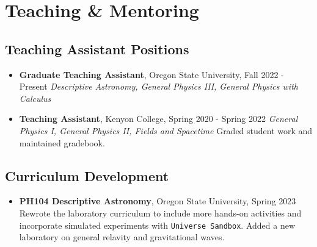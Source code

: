 \documentclass[11pt,letterpaper,sans,unicode]{moderncv}
\newcommand{\blucirc}{{\color{color1} $\circ\;\;$}}
\begin{document}
{%

\section{Teaching \& Mentoring}

\subsection{Teaching Assistant Positions}
\renewcommand\labelitemi{\blucirc}
\begin{itemize}[leftmargin=8mm]
\setlength\itemsep{1mm}
\item \textbf{\color{color1} Graduate Teaching Assistant}, Oregon State University, \hfill Fall 2022 - Present
        \newline  \textit{Descriptive Astronomy, General Physics III, General Physics with Calculus }
\item \textbf{\color{color1} Teaching Assistant}, Kenyon College, \hfill Spring 2020 - Spring 2022
        \newline  \textit{General Physics I, General Physics II, Fields and Spacetime}
        \newline Graded student work and maintained gradebook.
\end{itemize}

\subsection{Curriculum Development}
\renewcommand\labelitemi{\blucirc}
\begin{itemize}[leftmargin=8mm]
\setlength\itemsep{1mm}
\item \textbf{\color{color1} PH104 Descriptive Astronomy}, Oregon State University, \hfill Spring 2023
        \newline  Rewrote the laboratory curriculum to include more hands-on activities
                \newline and incorporate simulated experiments with \texttt{Universe Sandbox}.
                \newline Added a new laboratory on general relavity and gravitational waves.
\end{itemize}


}
\end{document}

